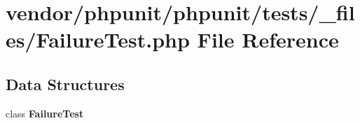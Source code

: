 \section{vendor/phpunit/phpunit/tests/\+\_\+files/\+Failure\+Test.php File Reference}
\label{_failure_test_8php}
\subsection*{Data Structures}
\begin{DoxyCompactItemize}
\item 
class {\bf Failure\+Test}
\end{DoxyCompactItemize}
